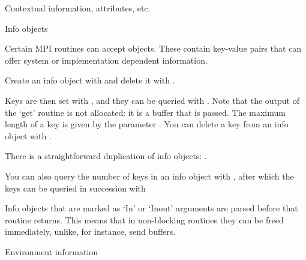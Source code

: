 
\lstset{style=reviewcode,language=C}
 {Contextual information, attributes, etc.}
\label{sec:context}

 {Info objects}
\label{sec:mpi-info}

Certain MPI routines can accept  objects.
These contain key-value pairs that can offer system or implementation
dependent information.

Create an info object with 
and delete it with .

Keys are then set with ,
and they can be queried with .
Note that the output of the `get' routine is not allocated:
it is a buffer that is passed. 
The maximum length of a key is given by the parameter
.
You can delete a key from an info object with .

There is a straightforward duplication of info objects:
.

You can also query the number of keys in an info object with
,
after which the keys can be queried in succession with

Info objects that are marked as `In' or `Inout' arguments
are parsed before that routine returns.
This means that in non-blocking routines they can be freed immediately,
unlike, for instance, send buffers.

 {Environment information}
\label{sec:mpi-info-env}

